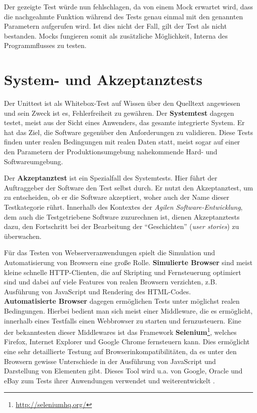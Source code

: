   Der gezeigte Test würde nun fehlschlagen, da von einem Mock erwartet wird, dass die nachgeahmte Funktion während des Tests genau einmal mit den genannten Parametern aufgerufen wird. Ist dies nicht der Fall, gilt der Test als nicht bestanden. Mocks fungieren somit als zusätzliche Möglichkeit, Interna des Programmflusses zu testen.

\section{System- und Akzeptanztests}
\label{sec:acceptance}
Der Unittest ist als Whitebox-Test auf Wissen über den Quelltext angewiesen und sein Zweck ist es, Fehlerfreiheit zu gewähren. Der \textbf{Systemtest} dagegen testet, meist aus der Sicht eines Anwenders, das gesamte integrierte System. Er hat das Ziel, die Software gegenüber den Anforderungen zu validieren. Diese Tests finden unter realen Bedingungen mit realen Daten statt, meist sogar auf einer den Parametern der Produktionsumgebung nahekommende Hard- und Softwareumgebung.

Der \textbf{Akzeptanztest} ist ein Spezialfall des Systemtests. Hier führt der Auftraggeber der Software den Test selbst durch. Er nutzt den Akzeptanztest, um zu entscheiden, ob er die Software akzeptiert, woher auch der Name dieser Testkategorie rührt.
Innerhalb des Kontextes der \textit{Agilen Software-Entwicklung}, dem auch die Testgetriebene Software zuzurechnen ist, dienen Akzeptanztests dazu, den Fortschritt bei der Bearbeitung der "`Geschichten"' (\textit{user stories}) zu überwachen.

Für das Testen von Webserveranwendungen spielt die Simulation und Automatisierung von Browsern eine große Rolle. \textbf{Simulierte Browser} sind meist kleine schnelle HTTP-Clienten, die auf Skripting und Fernsteuerung optimiert sind und dabei auf viele Features von realen Browsern verzichten, z.B. Ausführung von JavaScript und Rendering des HTML-Codes. \\
\textbf{Automatisierte Browser} dagegen ermöglichen Tests unter möglichst realen Bedingungen. Hierbei bedient man sich meist einer Middleware, die es ermöglicht, innerhalb eines Testfalls einen Webbrowser zu starten und fernzusteuern. Eine der bekanntesten dieser Middlewares ist das Framework \textbf{Selenium}\footnote{\url{http://seleniumhq.org/}}, welches Firefox, Internet Explorer und Google Chrome fernsteuern kann. Dies ermöglicht eine sehr detaillierte Testung auf Browserinkompatibilitäten, da es unter den Browsern gewisse Unterschiede in der Ausführung von JavaScript und Darstellung von Elementen gibt. Dieses Tool wird u.a. von Google, Oracle und eBay zum Tests ihrer Anwendungen verwendet und weiterentwickelt \citep{selenium_hq_selenium_2010}.
